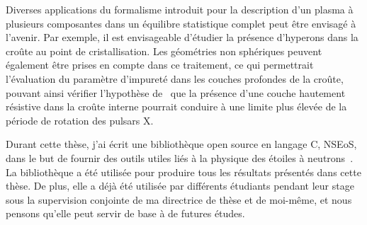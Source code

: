 Diverses applications du formalisme introduit pour la description d'un plasma à
plusieurs composantes dans un équilibre statistique complet peut être envisagé 
à l'avenir. 
Par exemple, il est envisageable d'étudier la présence d'hyperons dans la 
croûte au point de cristallisation. 
Les géométries non sphériques peuvent également être prises en compte dans ce
traitement, ce qui permettrait l'évaluation du paramètre d'impureté dans les 
couches profondes de la croûte, pouvant ainsi vérifier l'hypothèse 
de~\cite{Pons2013} que la présence d'une couche hautement résistive dans la 
croûte interne pourrait conduire à une limite plus élevée de la période de 
rotation des pulsars X.

Durant cette thèse, j'ai écrit une bibliothèque open source en langage C,
NSEoS, dans le but de fournir des outils utiles liés à la physique des étoiles 
à neutrons~\cite{NSEoS}. La bibliothèque a été utilisée pour produire tous les 
résultats présentés dans cette thèse.
De plus, elle a déjà été utilisée par différents étudiants pendant leur stage 
sous la supervision conjointe de ma directrice de thèse et de moi-même, et 
nous pensons qu'elle peut servir de base à de futures études.
